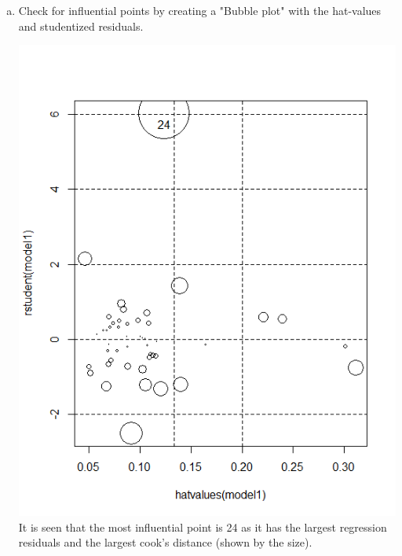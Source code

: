 \documentclass[12pt,letterpaper]{article}
\begin{document}
\begin{enumerate}[(a)]
	\vspace{6cm}
	\item Check for influential points by creating a "Bubble plot" with the hat-values and studentized residuals.
	
	
		\includegraphics{PS5ee.png}
	It is seen that the most influential point is 24 as it has the largest regression residuals and the largest cook's distance (shown by the size).  
\end{enumerate}
\end{document}
